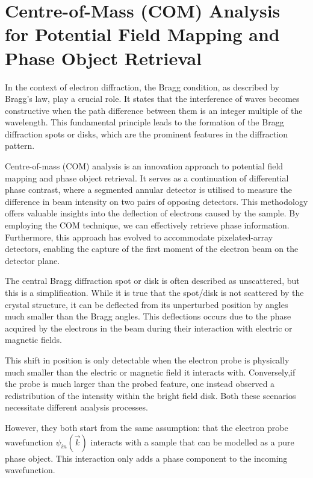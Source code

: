 
\section{Centre-of-Mass (COM) Analysis for Potential Field Mapping and Phase Object Retrieval}
%
In the context of electron diffraction, the Bragg condition, as described by Bragg's law, play a crucial role. It states that the interference of waves becomes constructive when the path difference between them is an integer multiple of the wavelength. This fundamental principle leads to the formation of the Bragg diffraction spots or disks, which are the prominent features in the diffraction pattern.

Centre-of-mass (COM) analysis is an innovation approach to potential field mapping and phase object retrieval. 
%
It serves as a continuation of differential phase contrast, where a segmented annular detector is utilised to measure the difference in beam intensity on two pairs of opposing detectors. 
%
This methodology offers valuable insights into the deflection of electrons caused by the sample. 
%
By employing the COM technique, we can effectively  retrieve phase information. 
%
Furthermore, this approach has evolved to accommodate pixelated-array detectors, enabling the capture of the first moment of the electron beam on the detector plane. 

The central Bragg diffraction spot or disk is often described as unscattered, but this is a simplification. 
%
While it is true that the spot/disk is not scattered by the crystal structure, it can be deflected from its  unperturbed position by angles much smaller than the Bragg angles. 
%
This deflections occurs due to the phase acquired by the electrons in the beam during their interaction with electric or magnetic fields.

This shift in position is only detectable when the electron probe is physically much smaller than the electric or magnetic field it interacts with.
%
Conversely,if the probe is much larger than the probed feature, one instead observed a redistribution of the intensity within the bright field disk.
%
Both these scenarios necessitate different analysis processes.

However, they both start from the same assumption: that the electron probe wavefunction $\psi_{in}(\vec{k})$ interacts with a sample that can be modelled as a pure phase object. This interaction only adds a phase component to the incoming wavefunction\cite{caoTheoryPracticeElectron2018, lazicPhaseContrastSTEM2016}. 

